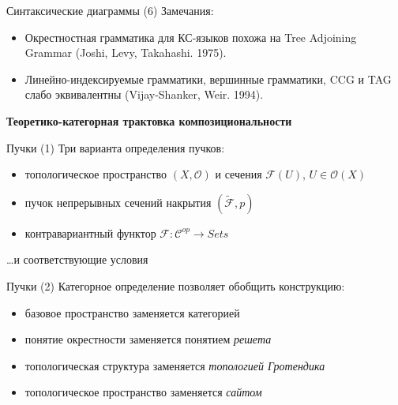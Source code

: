 \documentclass{beamer}
\begin{document}
\begin{frame}{Синтаксические диаграммы (6)}
Замечания:\\
\medskip
\begin{small}
\begin{itemize}
	\item Окрестностная грамматика для КС-языков похожа на Tree Adjoining Grammar (Joshi, Levy, Takahashi. 1975).
	\item Линейно-индексируемые грамматики, вершинные грамматики, CCG и TAG слабо эквивалентны (Vijay-Shanker, Weir. 1994).
\end{itemize}
\end{small}
\end{frame}




\begin{frame}{}
\begin{center}
	\textbf{Теоретико-категорная трактовка композициональности}
\end{center}
\end{frame}

\begin{frame}{Пучки (1)}
Три варианта определения пучков:\\
\medskip
\begin{small}
\begin{itemize}
	\item топологическое пространство $(X, \mathcal{O})$ и сечения $\mathcal{F}(U)$, $U \in \mathcal{O}(X)$
	\item пучок непрерывных сечений накрытия $(\widetilde{\mathcal{F}}, p)$
	\item контравариантный функтор $\mathcal{F} : \mathcal{C}^{op} \to Sets$
\end{itemize}
\end{small}
\medskip
\dots и соответствующие условия
\end{frame}

\begin{frame}{Пучки (2)}
Категорное определение позволяет обобщить конструкцию:\\
\medskip
\begin{small}
\begin{itemize}
	\item базовое пространство заменяется категорией
	\item понятие окрестности заменяется понятием \textit{решета}
	\item топологическая структура заменяется \textit{топологией Гротендика}
	\item топологическое пространство заменяется \textit{сайтом}
\end{itemize}
\end{small}
\end{frame}
\end{document}
